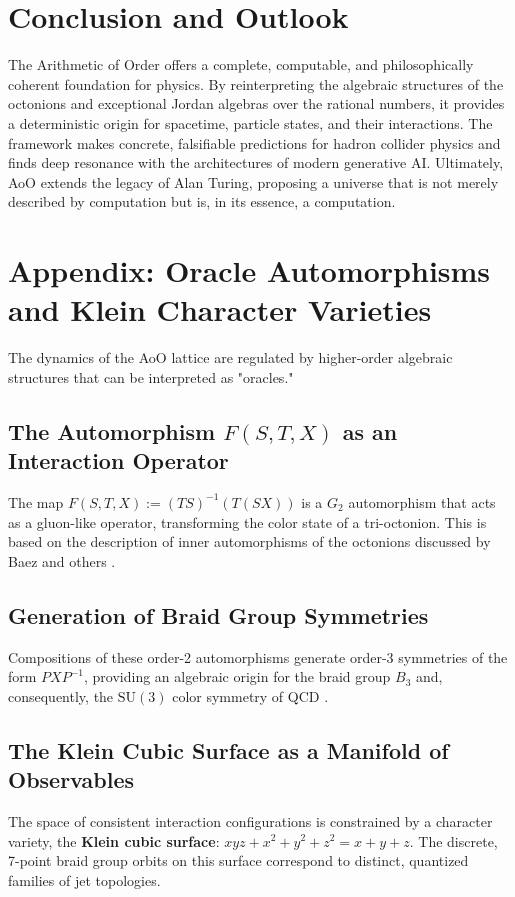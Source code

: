 \documentclass[11pt, a4paper]{article}
\theoremstyle{definition}
\theoremstyle{remark}
\begin{document}
\section{Conclusion and Outlook}
The Arithmetic of Order offers a complete, computable, and philosophically coherent foundation for physics. By reinterpreting the algebraic structures of the octonions and exceptional Jordan algebras over the rational numbers, it provides a deterministic origin for spacetime, particle states, and their interactions. The framework makes concrete, falsifiable predictions for hadron collider physics and finds deep resonance with the architectures of modern generative AI. Ultimately, AoO extends the legacy of Alan Turing, proposing a universe that is not merely described by computation but is, in its essence, a computation.

\appendix
\section{Appendix: Oracle Automorphisms and Klein Character Varieties}
The dynamics of the AoO lattice are regulated by higher-order algebraic structures that can be interpreted as "oracles."

\subsection{The Automorphism $F(S,T,X)$ as an Interaction Operator}
The map $F(S,T,X) := (TS)^{-1}(T(SX))$ is a $G_2$ automorphism that acts as a gluon-like operator, transforming the color state of a tri-octonion. This is based on the description of inner automorphisms of the octonions discussed by Baez and others \cite{BaezBlog}.

\subsection{Generation of Braid Group Symmetries}
Compositions of these order-2 automorphisms generate order-3 symmetries of the form $PXP^{-1}$, providing an algebraic origin for the braid group $B_3$ and, consequently, the $\mathrm{SU}(3)$ color symmetry of QCD \cite{EK2025c}.

\subsection{The Klein Cubic Surface as a Manifold of Observables}
The space of consistent interaction configurations is constrained by a character variety, the \textbf{Klein cubic surface}: $xyz + x^2 + y^2 + z^2 = x + y + z$. The discrete, 7-point braid group orbits on this surface correspond to distinct, quantized families of jet topologies.
\end{document}
